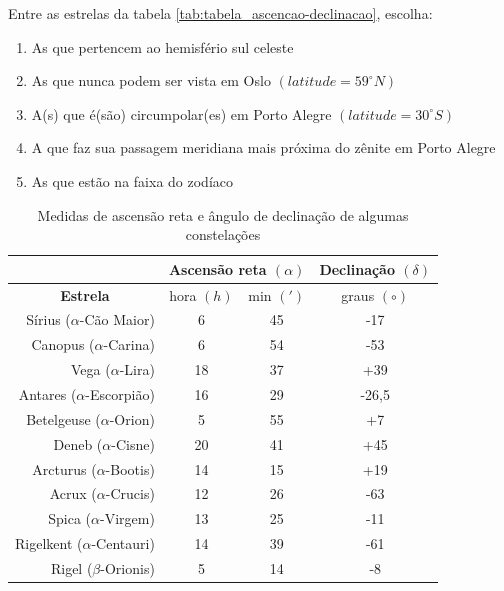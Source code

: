 \begin{prob}
	Entre as estrelas da tabela \eqref{tab:tabela_ascencao-declinacao}, escolha:
	\begin{enumerate}[label=\alph *)]
		\item As que pertencem ao hemisfério sul celeste
		\item As que nunca podem ser vista em Oslo $(latitude=59^{\circ}N)$
		\item A(s) que é(são) circumpolar(es) em Porto Alegre $(latitude=30^{\circ}S)$
		\item A que faz sua passagem meridiana mais próxima do zênite em Porto Alegre
		\item As que estão na faixa do zodíaco
	\end{enumerate}
	\begin{table}[!ht]
		\centering
		\caption{Medidas de ascensão reta e ângulo de declinação de algumas constelações}
		\label{tab:tabela_ascencao-declinacao}
		\begin{tabular}{r|cc|c|}
		\cline{2-4}
		\multicolumn{1}{l|}{}                  & \multicolumn{2}{c|}{\textbf{Ascensão reta $(\alpha)$}} & \textbf{Declinação $(\delta)$} \\ \hline
		\multicolumn{1}{|c|}{\textbf{Estrela}} & \multicolumn{1}{c|}{hora $(h)$}    & min $(\prime)$    & graus $(\circ)$                \\ \hline
		\multicolumn{1}{|r|}{Sírius ($\alpha$-Cão Maior)}  & \multicolumn{1}{c|}{6}  & 45 & -17   \\ \hline
		\multicolumn{1}{|r|}{Canopus ($\alpha$-Carina)}     & \multicolumn{1}{c|}{6}  & 54 & -53   \\ \hline
		\multicolumn{1}{|r|}{Vega ($\alpha$-Lira)}         & \multicolumn{1}{c|}{18} & 37 & +39   \\ \hline
		\multicolumn{1}{|r|}{Antares ($\alpha$-Escorpião)} & \multicolumn{1}{c|}{16} & 29 & -26,5 \\ \hline
		\multicolumn{1}{|r|}{Betelgeuse ($\alpha$-Orion)}  & \multicolumn{1}{c|}{5}  & 55 & +7    \\ \hline
		\multicolumn{1}{|r|}{Deneb ($\alpha$-Cisne)}        & \multicolumn{1}{c|}{20} & 41 & +45    \\ \hline
		\multicolumn{1}{|r|}{Arcturus ($\alpha$-Bootis)}   & \multicolumn{1}{c|}{14} & 15 & +19   \\ \hline
		\multicolumn{1}{|r|}{Acrux ($\alpha$-Crucis)}      & \multicolumn{1}{c|}{12} & 26 & -63   \\ \hline
		\multicolumn{1}{|r|}{Spica ($\alpha$-Virgem)}      & \multicolumn{1}{c|}{13} & 25 & -11   \\ \hline
		\multicolumn{1}{|r|}{Rigelkent ($\alpha$-Centauri)} & \multicolumn{1}{c|}{14} & 39 & -61   \\ \hline
		\multicolumn{1}{|r|}{Rigel ($\beta$-Orionis)}      & \multicolumn{1}{c|}{5}  & 14 & -8    \\ \hline
		\end{tabular}
		\end{table}
\end{prob}
